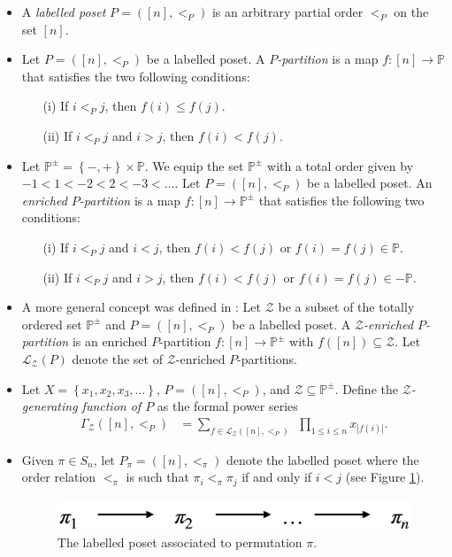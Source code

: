 \documentclass[numbers=enddot,12pt,final,onecolumn,notitlepage]{scrartcl}%
\newcommand{\PP}{\mathbb{P}} %
\newcommand{\defn}[1]{{\color{darkred}\emph{#1}}}
\newcommand{\0}{\phantom{c}}
\let\sumnonlimits\sum
\let\prodnonlimits\prod
\renewcommand{\sum}{\sumnonlimits\limits}
\renewcommand{\prod}{\prodnonlimits\limits}
\begin{document}
\begin{itemize}
\item A \defn{labelled poset} $P=([n],<_P)$ is an arbitrary partial order $<_P$ on the set $[n]$. 
\item Let $P = ([n],<_P)$ be a labelled poset.
A \defn{$P$-partition} is a map $f: [n]\longrightarrow \PP$ that satisfies the two following conditions:
\begin{itemize}
\item[(i)] If $i <_P j$, then $f(i) \leq f(j)$.
\item[(ii)] If $i <_P j$ and $i > j$, then $f(i) < f(j)$.
\end{itemize}
\item Let $\PP^{\pm}=\left\{-,+\right\} \times \PP$. We equip the set $\PP^{\pm}$ with a total order given by $-1<1<-2<2<-3<\dots$. 
Let $P = ([n],<_P)$ be a labelled poset.
An \defn{enriched $P$-partition} is a map $f: [n]\longrightarrow \PP^{\pm} $ that satisfies the following two conditions:
\begin{itemize}
\item[(i)] If $i <_P j$ and $i < j$, then $f(i) < f(j)$ or $f(i) = f(j) \in \PP$.
\item[(ii)] If $i <_P j$ and $i>j$, then $f(i) < f(j)$ or $f(i) = f(j) \in -\PP$.
\end{itemize} 
\item A more general concept was defined in \cite{Gri18}: Let $\mathcal{Z}$ be a subset of the totally ordered set $\PP^{\pm}$ and $P=([n],<_P)$ be a labelled poset.
A \defn{$\mathcal{Z}$-enriched $P$-partition} is
an enriched $P$-partition $f : [n] \longrightarrow \PP^{\pm} $ with $f([n]) \subseteq \mathcal{Z}$.
Let $\mathcal{L}_\mathcal{Z}(P)$ denote the set of $\mathcal{Z}$-enriched $P$-partitions.

\item Let $X = \left\{x_1,x_2,x_3,\ldots\right\}$, $P =([n],<_P)$, and $\mathcal{Z} \subseteq \PP^{\pm}$. Define the  \defn{$\mathcal{Z}$-generating function of $P$} as the formal power series
\begin{align}
\label{eq : GammaTrad}
\Gamma_{\mathcal{Z}}([n], <_P) &= \sum_{f \in \mathcal{L}_\mathcal{Z}([n],<_P)}\ \ \prod_{1\leq i \leq n}x_{|f(i)|} .
\end{align}
\item Given $\pi \in S_n$, let $P_\pi = ([n],<_\pi)$ denote the labelled poset where the order relation $<_\pi$ is such that $\pi_i <_\pi \pi_j$ if and only if $i < j$ (see Figure \ref{fig : ppart}).
\begin{figure}[htbp]
\begin{center}
 \includegraphics[scale=0.20]{PPart}\caption{The labelled poset associated to permutation $\pi$.}
 \label{fig : ppart}
 \end{center}
 \end{figure}


\end{itemize}
\end{document}
